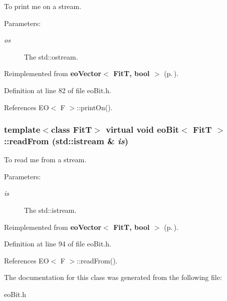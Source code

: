 To print me on a stream. 

\begin{Desc}
\item[Parameters:]
\begin{description}
\item[{\em os}]The std::ostream. \end{description}
\end{Desc}


Reimplemented from {\bf eo\-Vector$<$ Fit\-T, bool $>$} {\rm (p.\,\pageref{classeo_vector_a4})}.

Definition at line 82 of file eo\-Bit.h.

References EO$<$ F $>$::print\-On().
\subsubsection{\setlength{\rightskip}{0pt plus 5cm}template$<$class Fit\-T$>$ virtual void {\bf eo\-Bit}$<$ {\bf Fit\-T} $>$::read\-From (std::istream \& {\em is})\hspace{0.3cm}{\tt  [inline, virtual]}}\label{classeo_bit_a3}


To read me from a stream. 

\begin{Desc}
\item[Parameters:]
\begin{description}
\item[{\em is}]The std::istream. \end{description}
\end{Desc}


Reimplemented from {\bf eo\-Vector$<$ Fit\-T, bool $>$} {\rm (p.\,\pageref{classeo_vector_a5})}.

Definition at line 94 of file eo\-Bit.h.

References EO$<$ F $>$::read\-From().

The documentation for this class was generated from the following file:\begin{CompactItemize}
\item 
eo\-Bit.h\end{CompactItemize}

